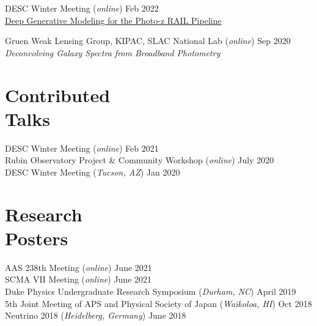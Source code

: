 \documentclass[margin]{res}
\begin{document}
\begin{resume}
\vspace{-3.5mm} \hangindent=2mm
DESC Winter Meeting (\textit{online}) \hfill Feb 2022 \\ \href{https://docs.google.com/presentation/d/179O1gnQpVfbIwZLfi7TlW8gYhP3K4MFBbi_8lAighNs/edit?usp=sharing}{Deep Generative Modeling for the Photo-z RAIL Pipeline}

\vspace{-3.5mm} \hangindent=2mm
Gruen Weak Lensing Group, KIPAC, SLAC National Lab (\textit{online}) \hfill Sep 2020 \\ \textit{Deconvolving Galaxy Spectra from Broadband Photometry} \\

\section{Contributed \\Talks}

DESC Winter Meeting (\textit{online}) \hfill Feb 2021 \\
Rubin Observatory Project \& Community Workshop (\textit{online}) \hfill July 2020 \\
DESC Winter Meeting (\textit{Tucson, AZ}) \hfill Jan 2020 \\

\section{Research \\Posters}

AAS 238th Meeting (\textit{online}) \hfill June 2021 \\
SCMA VII Meeting (\textit{online}) \hfill June 2021 \\
Duke Physics Undergraduate Research Symposium (\textit{Durham, NC}) \hfill April 2019 \\
5th Joint Meeting of APS and Physical Society of Japan (\textit{Waikoloa, HI}) \hfill Oct 2018 \\
Neutrino 2018 (\textit{Heidelberg, Germany}) \hfill June 2018 \\


\end{resume}
\end{document}
